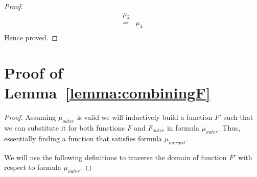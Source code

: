 \documentclass{llncs}
\newcommand{\inv}{\mathit{inv}}
\newcommand{\retVar}{\textit{retVar}}
\newcommand{\F}{\mathit{F}}
\newcommand{\n}{\textit{n}}
\newcommand{\g}{\textit{g}}
\newcommand{\gout}{\textit{gout}}
\newcommand{\gbef}{\textit{gbef}}
\newcommand{\formula}{\mu}
\begin{document}
\begin{subappendices}
\begin{proof}
\begin{align*}
\formula_2\\
=& \formula_4\\
\end{align*}
Hence proved.
\end{proof}

\section{Proof of Lemma~\ref{lemma:combiningF}}

\begin{proof}
  Assuming $\formula_{outer}$ is valid we will inductively build a
  function $\F'$ such that we can substitute it for both functions
  $\F$ and $\F_{outer}$ in formula $\formula_{outer}$. Thus,
essentially finding a function that satisfies formula
$\formula_{merged}$.



We will use the following definitions to traverse the domain of
function $\F'$ with respect to formula $\formula_{outer}$.


\end{proof}
\end{subappendices}
\end{document}
